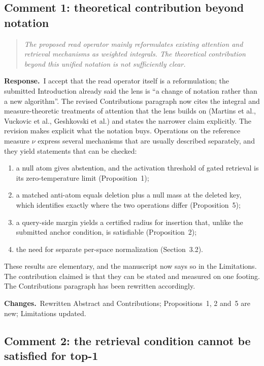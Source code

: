 \documentclass[11pt]{article}
\newenvironment{reviewer}{\par\medskip\noindent\begin{quote}\itshape}{\end{quote}}
\newcommand{\response}{\par\noindent\textbf{Response.}\ }
\newcommand{\changes}{\par\smallskip\noindent\textbf{Changes.}\ }
\begin{document}
\subsection*{Comment 1: theoretical contribution beyond notation}

\begin{reviewer}
The proposed read operator mainly reformulates existing attention and retrieval mechanisms as weighted integrals. The theoretical contribution beyond this unified notation is not sufficiently clear.
\end{reviewer}

\response I accept that the read operator itself is a reformulation; the submitted Introduction already said the lens is ``a change of notation rather than a new algorithm''. The revised Contributions paragraph now cites the integral and measure-theoretic treatments of attention that the lens builds on (Martins et al., Vuckovic et al., Geshkovski et al.) and states the narrower claim explicitly. The revision makes explicit what the notation buys. Operations on the reference measure $\nu$ express several mechanisms that are usually described separately, and they yield statements that can be checked:
\begin{enumerate}[label=(\alph*)]
\item a null atom gives abstention, and the activation threshold of gated retrieval is its zero-temperature limit (Proposition~1);
\item a matched anti-atom equals deletion plus a null mass at the deleted key, which identifies exactly where the two operations differ (Proposition~5);
\item a query-side margin yields a certified radius for insertion that, unlike the submitted anchor condition, is satisfiable (Proposition~2);
\item the need for separate per-space normalization (Section~3.2).
\end{enumerate}
These results are elementary, and the manuscript now says so in the Limitations. The contribution claimed is that they can be stated and measured on one footing. The Contributions paragraph has been rewritten accordingly.

\changes Rewritten Abstract and Contributions; Propositions~1, 2 and~5 are new; Limitations updated.

\subsection*{Comment 2: the retrieval condition cannot be satisfied for top-1}
\end{document}
